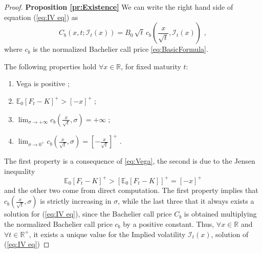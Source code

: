 \documentclass[12pt]{article}
\theoremstyle{definition}
\theoremstyle{remark}
\numberwithin{theorem}{section}
\numberwithin{proposition}{section}
\numberwithin{lemma}{section}
\numberwithin{corollary}{section}
\numberwithin{definition}{section}
\numberwithin{remark}{section}
\numberwithin{example}{section}
\newcommand{\E}{\mathbb{E}}
\newcommand{\R}{\mathbb{R}}
\newcommand{\be}{\begin{equation}}
\newcommand{\en}{\end{equation}}
\begin{document}
\begin{proof} {\bf Proposition \ref{pr:Existence} }
We can write the right hand side of equation (\ref{eq:IV eq}) as
\be
\label{eq:BachelierFormula_2}
C_b\left(x, t; \mathcal{I}_t(x)\right) = 
B_0  \,   \sqrt{t} \, c_b\left(  \frac{x}{\sqrt{t}}, \mathcal{I}_t(x) \right)  \, \, ,
\en
where $c_b$ is the normalized Bachelier call price \eqref{eq:BasicFormula}.

\smallskip

The following  properties hold $\forall x \in \R$, for fixed maturity $t$:
\begin{enumerate}[label=(\roman*)]
\item Vega is positive ;
\item
$
 \E_0 \left[ F_t - K \right]^+ > [-x]^+ \; ;
$ 
\item
$
\displaystyle\lim_{\sigma \to+ \infty} c_{b}\left(\displaystyle\frac{x}{\sqrt{t}}, {\sigma}\right) =+ \infty   \; ;
$
\item
$
\displaystyle\lim_{\sigma \to 0^+} c_{b}\left(\displaystyle\frac{x}{\sqrt{t}}, \sigma\right) = \left[-\frac{x}{\sqrt{t}}\right]^+  \; .
$
\end{enumerate}
The first property is a consequence of \eqref{eq:Vega}, the second is due to the Jensen inequality 
\[
   \E_0 \left[ F_t - K \right]^+  >  \left[ \E_0 [F_t - K] \right]^+ =   [-x]^+
\]
and the other two come from direct computation.
The first property implies that $c_{b}\left(\frac{x}{\sqrt{t}}, \sigma\right) $ is strictly increasing in $\sigma$, while the last three that it always exists a solution for (\ref{eq:IV eq}), since the Bachelier call price $C_b$ is obtained multiplying the normalized Bachelier call price $c_b$ by a positive constant.
Thus,  $\forall x \in \R$ and $\forall t \in \R^+$, it exists a unique value for the Implied volatility $\mathcal{I}_t(x)$, solution of (\ref{eq:IV eq})
\end{proof}
\end{document}
